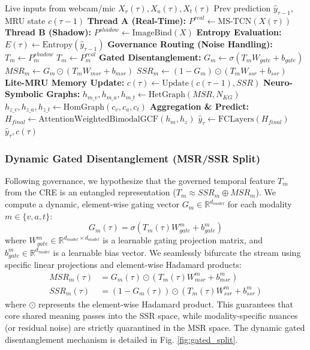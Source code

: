 \documentclass[sn-mathphys,Numbered]{sn-jnl}
\theoremstyle{thmstyleone}
\theoremstyle{thmstyletwo}
\theoremstyle{thmstylethree}
\begin{document}
\begin{algorithm}[H]
\caption{DRCFNet Live Inference (Streaming Step $\tau$)}
\label{alg:drcfnet}
\begin{algorithmic}[1]
\Require Live inputs from webcam/mic $X_v(\tau), X_a(\tau), X_t(\tau)$
\Require Prev prediction $\hat{y}_{\tau-1}$, MRU state $c(\tau-1)$
\State \textbf{Thread A (Real-Time):} $P^{real} \gets \text{MS-TCN}(X(\tau))$
\State \textbf{Thread B (Shadow):} $P^{shadow} \gets \text{ImageBind}(X)$
\State \textbf{Entropy Evaluation:} $E(\tau) \gets \text{Entropy}(\hat{y}_{\tau-1})$
\State \textbf{Governance Routing (Noise Handling):}
        \State $T_m \gets P_m^{shadow}$ 
    \Else
        \State $T_m \gets P_m^{real}$
    \EndIf
\EndFor
\State \textbf{Gated Disentanglement:}
    \State $G_m \gets \sigma(T_m W_{gate} + b_{gate})$
    \State $MSR_m \gets G_m \odot (T_m W_{msr} + b_{msr})$
    \State $SSR_m \gets (1 - G_m) \odot (T_m W_{ssr} + b_{ssr})$
\EndFor
\State \textbf{Lite-MRU Memory Update:} $c(\tau) \gets \text{Update}(c(\tau-1), SSR)$
\State \textbf{Neuro-Symbolic Graphs:}
\State $h_{m\_v}, h_{m\_a}, h_{m\_t} \gets \text{HetGraph}(MSR, N_{KG})$
\State $h_{z\_v}, h_{z\_a}, h_{z\_t} \gets \text{HomGraph}(c_v, c_a, c_t)$
\State \textbf{Aggregation \& Predict:}
\State $H_{final} \gets \text{AttentionWeightedBimodalGCF}(h_m, h_z)$
\State $\hat{y}_\tau \gets \text{FCLayers}(H_{final})$
\State \Return $\hat{y}_\tau, c(\tau)$
\end{algorithmic}
\end{algorithm}

\subsubsection{Dynamic Gated Disentanglement (MSR/SSR Split)}
Following governance, we hypothesize that the governed temporal feature $T_m$ from the CRE is an entangled representation ($T_m \approx SSR_m \oplus MSR_m$). We compute a dynamic, element-wise gating vector $G_m \in \mathbb{R}^{d_{model}}$ for each modality $m \in \{v, a, t\}$:
\begin{equation}
    G_m(\tau) = \sigma\left(T_m(\tau) W_{gate}^m + b_{gate}^m\right)
\end{equation}
where $W_{gate}^m \in \mathbb{R}^{d_{model} \times d_{model}}$ is a learnable gating projection matrix, and $b_{gate}^m \in \mathbb{R}^{d_{model}}$ is a learnable bias vector. We seamlessly bifurcate the stream using specific linear projections and element-wise Hadamard products:
\begin{align}
    MSR_m(\tau) &= G_m(\tau) \odot \left(T_m(\tau) W_{msr}^m + b_{msr}^m\right) \\
    SSR_m(\tau) &= (1 - G_m(\tau)) \odot \left(T_m(\tau) W_{ssr}^m + b_{ssr}^m\right)
\end{align}
where $\odot$ represents the element-wise Hadamard product. This guarantees that core shared meaning passes into the SSR space, while modality-specific nuances (or residual noise) are strictly quarantined in the MSR space. The dynamic gated disentanglement mechanism is detailed in Fig. \ref{fig:gated_split}.
\end{document}
